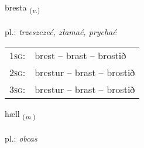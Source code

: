 \documentclass[frontgrid, backgrid]{flacards}\usepackage[]{graphicx}\usepackage[]{xcolor}
\begin{document}
\renewcommand{\flhead}{\vskip5pt \fboxsep=0pt {\small\bfseries\footnotesize Sagnorð | czasownik}}
\renewcommand{\fcfoot}{\vskip5pt \fboxsep=0pt \hspace{2pt}{\small\bfseries\footnotesize 3K}}

\renewcommand{\blhead}{\vskip5pt {\small\bfseries\footnotesize Sagnorð | czasownik }}
\renewcommand{\bcfoot}{\vskip5pt \hspace{2pt}{\small\bfseries\footnotesize 3K}}


{bresta \small{\textsubscript{(\textit{v.})}} \\[1ex] %
\textphonetic{[prɛsta]} \\
pl.: \emph{trzeszczeć, złamać, prychać} \\  [2ex]
\renewcommand*{\arraystretch}{0.8}
\begin{tabular}{p{1cm}l}
\textsc{1sg}: & brest -- brast -- brostið \\ 
\textsc{2sg}: & brestur -- brast -- brostið \\ 
\textsc{3sg}: & brestur -- brast -- brostið \\ 
\end{tabular}
}

\renewcommand{\flhead}{\vskip5pt \fboxsep=0pt {\small\bfseries\footnotesize Nafnorð | rzeczownik}}
\renewcommand{\fcfoot}{\vskip5pt \fboxsep=0pt \hspace{2pt}{\small\bfseries\footnotesize 3K}}

\renewcommand{\blhead}{\vskip5pt {\small\bfseries\footnotesize Nafnorð | rzeczownik }}
\renewcommand{\bcfoot}{\vskip5pt \hspace{2pt}{\small\bfseries\footnotesize 3K}}


{hæll \small{\textsubscript{(\textit{m.})}} \\[1ex] %
\textphonetic{[haitl̥]} \\
pl.: \emph{obcas} \\  [2ex]
\renewcommand*{\arraystretch}{0.8}
}
\end{document}
